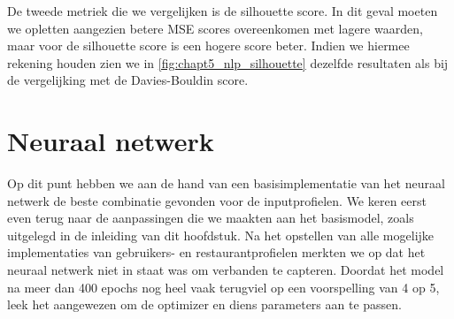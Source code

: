 
De tweede metriek die we vergelijken is de silhouette score. In dit geval moeten we opletten aangezien betere MSE scores overeenkomen met lagere waarden, maar voor de silhouette score is een hogere score beter. Indien we hiermee rekening houden zien we in \autoref{fig:chapt5_nlp_silhouette} dezelfde resultaten als bij de vergelijking met de Davies-Bouldin score.


























\section{Neuraal netwerk}
\label{sec:chapt5_neuraal_netwerk}
Op dit punt hebben we aan de hand van een basisimplementatie van het neuraal netwerk de beste combinatie gevonden voor de inputprofielen. We keren eerst even terug naar de aanpassingen die we maakten aan het basismodel, zoals uitgelegd in de inleiding van dit hoofdstuk. Na het opstellen van alle mogelijke implementaties van gebruikers- en restaurantprofielen merkten we op dat het neuraal netwerk niet in staat was om verbanden te capteren. Doordat het model na meer dan 400 epochs nog heel vaak terugviel op een voorspelling van 4 op 5, leek het aangewezen om de optimizer en diens parameters aan te passen.

